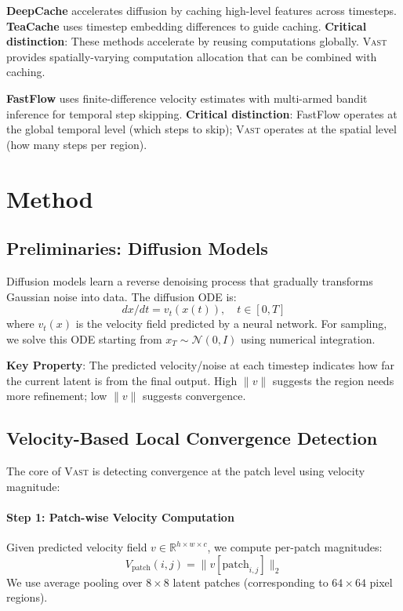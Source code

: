\documentclass{article}
\newcommand{\vast}{\textsc{Vast}}
\begin{document}
\textbf{DeepCache} \citep{ma2024deepcache} accelerates diffusion by caching high-level features across timesteps. \textbf{TeaCache} \citep{liu2025teacache} uses timestep embedding differences to guide caching. \textbf{Critical distinction}: These methods accelerate by reusing computations globally. \vast{} provides spatially-varying computation allocation that can be combined with caching.

\textbf{FastFlow} \citep{bajpai2026fastflow} uses finite-difference velocity estimates with multi-armed bandit inference for temporal step skipping. \textbf{Critical distinction}: FastFlow operates at the global temporal level (which steps to skip); \vast{} operates at the spatial level (how many steps per region).

\section{Method}
\label{sec:method}

\subsection{Preliminaries: Diffusion Models}

Diffusion models \citep{ho2020denoising} learn a reverse denoising process that gradually transforms Gaussian noise into data. The diffusion ODE is:
\begin{equation}
    dx/dt = v_t(x(t)), \quad t \in [0, T]
\end{equation}
where $v_t(x)$ is the velocity field predicted by a neural network. For sampling, we solve this ODE starting from $x_T \sim \mathcal{N}(0, I)$ using numerical integration.

\textbf{Key Property}: The predicted velocity/noise at each timestep indicates how far the current latent is from the final output. High $\|v\|$ suggests the region needs more refinement; low $\|v\|$ suggests convergence.

\subsection{Velocity-Based Local Convergence Detection}

The core of \vast{} is detecting convergence at the patch level using velocity magnitude:

\paragraph{Step 1: Patch-wise Velocity Computation}
Given predicted velocity field $v \in \mathbb{R}^{h \times w \times c}$, we compute per-patch magnitudes:
\begin{equation}
    V_{\text{patch}}(i,j) = \|v[\text{patch}_{i,j}]\|_2
\end{equation}
We use average pooling over $8 \times 8$ latent patches (corresponding to $64 \times 64$ pixel regions).
\end{document}
